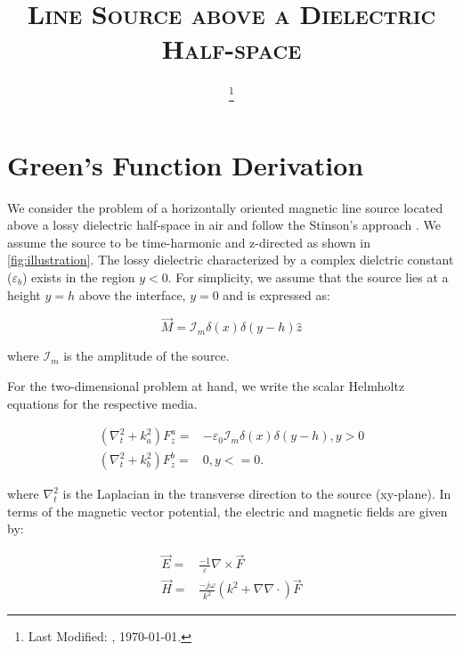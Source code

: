 \documentclass{article}
\begin{document}
  \title{\textsc{Line Source above a Dielectric Half-space}\\}
  \date{\footnote{Last Modified: \currenttime, \today.}}
  \maketitle
\section{Green's Function Derivation}
  We consider the problem of a horizontally oriented magnetic line source located above a lossy dielectric half-space in air and follow the Stinson's approach . We assume the source to be time-harmonic and z-directed as shown in \ref{fig:illustration}. The lossy dielectric characterized by a complex dielctric constant ($\varepsilon_b$) exists in the region $y < 0$. For simplicity, we assume that the source lies at a height $y = h$ above the interface, $y = 0$ and is expressed as:

  \begin{equation}
    \overrightarrow{M} = \mathcal{I}_m \delta(x) \delta(y -h) \widehat{z}
    \label{eq:Current}
  \end{equation}

  where $\mathcal{I}_m$ is the amplitude of the source.

  For the two-dimensional problem at hand, we write the scalar Helmholtz equations for the respective media.

  \begin{subequations}
    \begin{align}
      \left( \nabla_t^2 + k_a^2 \right) F_z^a ={}& -\varepsilon_0 \mathcal{I}_m  \delta(x) \delta(y - h), y > 0
      \label{eq:Hemup} \\
      \left( \nabla_t^2 + k_b^2 \right) F_z^b ={}& 0,     y <= 0
      \label{eq:Hemdn}.
    \end{align}
    \label{Hem}
  \end{subequations}

  where $\nabla_t^2$ is the Laplacian in the transverse direction to the source (xy-plane). In terms of the magnetic vector potential, the electric and magnetic fields are given by:

  \begin{subequations}
    \begin{align}
      \overrightarrow{E}  ={}& \frac{-1}{\varepsilon} \nabla \times \overrightarrow{F}
      \label{eq:E} \\
      \overrightarrow{H}  ={}& \frac{-j\omega}{k^2} \left( k^2 + \nabla \nabla \cdot \right) \overrightarrow{F}
      \label{eq:H}
    \end{align}
  \end{subequations}
\end{document}
